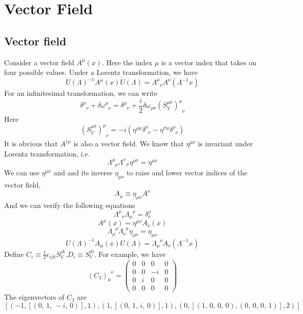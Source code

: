\documentclass[cyan]{elegantnote}
\author{Yuyang Songsheng}
\begin{document}
\maketitle
\tableofcontents
\chapter{Vector Field}
\section{Vector field}
Consider a vector field $A^{\mu}(x)$. Here the index $\mu$ is a vector index that takes on four possible values. Under a Lorentz transformation, we have
\[U(\Lambda)^{-1} A^{\mu}(x) U(\Lambda) = \Lambda^{\mu}_{\phantom{\mu}\nu} A^{\nu}(\Lambda^{-1}x)\]
For an infinitesimal transformation, we can write
\[\delta^{\mu}_{\phantom{\mu}\nu}+\delta \omega ^{\mu}_{\phantom{\mu}\nu} = \delta^{\mu}_{\phantom{\mu}\nu} + \frac{i}{2} \delta \omega_{\rho \sigma} (S_V^{\rho \sigma})^{\mu}_{\phantom{\mu}\nu}\]
Here
\[(S_V^{\rho \sigma})^{\mu}_{\phantom{\mu}\nu} = -i(\eta^{\rho \mu}\delta ^{\sigma}_{\phantom{\sigma}\nu} - \eta^{\sigma \mu}\delta^{\rho}_{\phantom{\rho}\nu})\]
It is obvious that $A^{\dagger \mu}$ is also a vector field. 
We know that $\eta^{\mu \nu}$ is invariant under Lorentz transformation, i.e.
\[\Lambda^{\mu}_{\phantom{\mu}\rho} \Lambda^{\nu}_{\phantom{\mu}\sigma} \eta^{\rho \sigma} = \eta^{\mu \nu} \]
We can use $\eta^{\mu \nu}$ and and its inverse $\eta_{\mu\nu}$ to raise and lower vector indices of the vector field,
\[A_{\mu} \equiv \eta_{\mu \nu} A^{\nu}\]
And we can verify the following equations
\[\Lambda^{\mu}_{\phantom{\mu}\nu} \Lambda_{\mu}^{\phantom{\mu}\rho} = \delta^{\rho}_{\nu} \]
\[A^{\mu}(x) = \eta^{\mu \nu} A_{\nu}(x)\]
\[\Lambda_{\mu}^{\phantom{\mu}\rho} \Lambda_{\nu}^{\phantom{\nu}\sigma} \eta_{\rho \sigma} = \eta_{\mu \nu}\]
\[U(\Lambda)^{-1} A_{\mu}(x) U(\Lambda) = \Lambda_{\mu}^{\phantom{\mu}\nu} A_{\nu}(\Lambda^{-1}x)\]
Define $C_i \equiv \frac{1}{2}\epsilon_{ijk}S_V^{jk}$,$D_i \equiv S_V^{i0}$. For example, we have
\[(C_3)_{\mu}^{\phantom{\mu}\nu} = \left(\begin{array}{rrrr}
0 & 0 & 0 & 0 \\
0 & 0 & -i & 0 \\
0 & i & 0 & 0 \\
0 & 0 & 0 & 0
\end{array}\right)\]
The eigenvectors of $C_3$ are
\[\left[\left(-1, \left[\left(0,\,1,\,-i,\,0\right)\right], 1\right),
\left(1, \left[\left(0,\,1,\,i,\,0\right)\right], 1\right), \left(0,
\left[\left(1,\,0,\,0,\,0\right), \left(0,\,0,\,0,\,1\right)\right],
2\right)\right]\]
\end{document}
